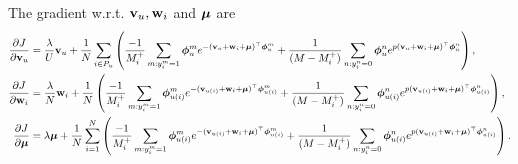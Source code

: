 The gradient w.r.t. $\mathbf{v}_u, \mathbf{w}_i$ and $\bm{\mu}$ are
\begin{equation*}
\begin{aligned}
\frac{\partial J}{\partial \mathbf{v}_u}
&= \frac{\lambda}{U} \mathbf{v}_u + \frac{1}{N} \sum_{i \in P_u} \left( 
   \frac{-1}{M_i^+} \sum_{m: y_i^m = 1} \bm{\phi}_u^m e^{-(\mathbf{v}_{u} + \mathbf{w}_i + \bm{\mu})^\top \bm{\phi}_u^m} 
   + \frac{1}{(M - M_i^+)} \sum_{n: y_i^n = 0} \bm{\phi}_u^n e^{p (\mathbf{v}_{u} + \mathbf{w}_i + \bm{\mu})^\top \bm{\phi}_u^n} \right), \\
\frac{\partial J}{\partial \mathbf{w}_i}
&= \frac{\lambda}{N} \mathbf{w}_i + \frac{1}{N} \left( 
   \frac{-1}{M_i^+} \sum_{m: y_i^m = 1} \bm{\phi}_{u(i)}^m e^{-(\mathbf{v}_{u(i)} + \mathbf{w}_i + \bm{\mu})^\top \bm{\phi}_{u(i)}^m} 
   + \frac{1}{(M - M_i^+)} \sum_{n: y_i^n = 0} \bm{\phi}_{u(i)}^n e^{p (\mathbf{v}_{u(i)} + \mathbf{w}_i + \bm{\mu})^\top \bm{\phi}_{u(i)}^n} \right), \\
\frac{\partial J}{\partial \bm{\mu}}
&= \lambda \bm{\mu} + \frac{1}{N} \sum_{i=1}^N \left( 
   \frac{-1}{M_i^+} \sum_{m: y_i^m = 1} \bm{\phi}_{u(i)}^m e^{-(\mathbf{v}_{u(i)} + \mathbf{w}_i + \bm{\mu})^\top \bm{\phi}_{u(i)}^m} 
   + \frac{1}{(M - M_i^+)} \sum_{n: y_i^n = 0} \bm{\phi}_{u(i)}^n e^{p (\mathbf{v}_{u(i)} + \mathbf{w}_i + \bm{\mu})^\top \bm{\phi}_{u(i)}^n} \right).
\end{aligned}
\end{equation*}

